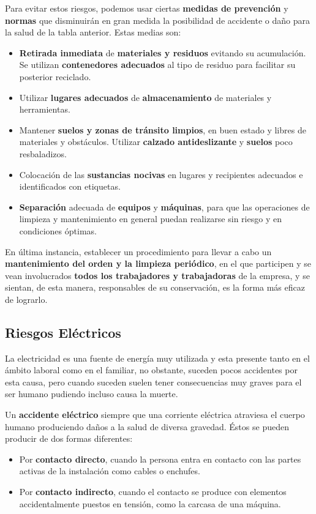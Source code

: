 Para evitar estos riesgos, podemos usar ciertas \textbf{medidas de prevención} y \textbf{normas} que disminuirán en gran medida la posibilidad de accidente o daño para la salud de la tabla anterior. Estas medias son:

\begin{itemize}
    \item \textbf{Retirada inmediata} de \textbf{materiales y residuos} evitando su acumulación. Se utilizan \textbf{contenedores adecuados} al tipo de residuo para facilitar su posterior reciclado.
    \item Utilizar \textbf{lugares adecuados} de \textbf{almacenamiento} de materiales y herramientas.
    \item Mantener \textbf{suelos y zonas de tránsito limpios}, en buen estado y libres de materiales y obstáculos. Utilizar \textbf{calzado antideslizante} y \textbf{suelos} poco resbaladizos.
    \item Colocación de las \textbf{sustancias nocivas} en lugares y recipientes adecuados e identificados con etiquetas.
    \item \textbf{Separación} adecuada de \textbf{equipos} y \textbf{máquinas}, para que las operaciones de limpieza y mantenimiento en general puedan realizarse sin riesgo y en condiciones óptimas.
\end{itemize}

En última instancia, establecer un procedimiento para llevar a cabo un \textbf{mantenimiento del orden y la limpieza periódico}, en el que participen y se vean involucrados \textbf{todos los trabajadores y trabajadoras} de la empresa, y se sientan, de esta manera, responsables de su conservación, es la forma más eficaz de lograrlo.

\subsection{Riesgos Eléctricos}
La electricidad es una fuente de energía muy utilizada y esta presente tanto en el ámbito laboral como en el familiar, no obstante, suceden pocos accidentes por esta causa, pero cuando suceden suelen tener consecuencias muy graves para el ser humano pudiendo incluso causa la muerte.

Un \textbf{accidente eléctrico} siempre que una corriente eléctrica atraviesa el cuerpo humano produciendo daños a la salud de diversa gravedad. Éstos se pueden producir de dos formas diferentes:

\begin{itemize}
    \item Por \textbf{contacto directo}, cuando la persona entra en contacto con las partes activas de la instalación como cables o enchufes.
    \item Por \textbf{contacto indirecto}, cuando el contacto se produce con elementos accidentalmente puestos en tensión, como la carcasa de una máquina.
\end{itemize}

